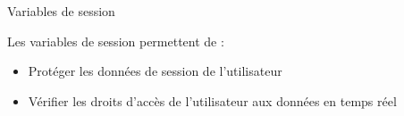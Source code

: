 \begin{frame}{Variables de session}

  Les variables de session permettent de :
  \begin{itemize}
  \item Protéger les données de session de l'utilisateur
  \item Vérifier les droits d'accès de l'utilisateur aux données en temps réel
  \end{itemize}
\end{frame}